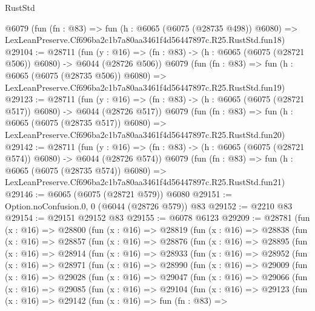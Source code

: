 \begin{lexlean}{RustStd}
\begin{coremodule}
    @6079
    (fun (fn : @83) =>
    fun (h : @6065 (@6075 (@28735 @498)) @6080) =>
    LexLeanPreserve.Cf696ba2c1b7a80aa3461f4d56447897c.R25.RustStd.fun18)
@29104 := @28711
    (fun (y : @16) => (fn : @83) -> (h : @6065 (@6075 (@28721 @506)) @6080) -> @6044 (@28726 @506))
    @6079
    (fun (fn : @83) =>
    fun (h : @6065 (@6075 (@28735 @506)) @6080) =>
    LexLeanPreserve.Cf696ba2c1b7a80aa3461f4d56447897c.R25.RustStd.fun19)
@29123 := @28711
    (fun (y : @16) => (fn : @83) -> (h : @6065 (@6075 (@28721 @517)) @6080) -> @6044 (@28726 @517))
    @6079
    (fun (fn : @83) =>
    fun (h : @6065 (@6075 (@28735 @517)) @6080) =>
    LexLeanPreserve.Cf696ba2c1b7a80aa3461f4d56447897c.R25.RustStd.fun20)
@29142 := @28711
    (fun (y : @16) => (fn : @83) -> (h : @6065 (@6075 (@28721 @574)) @6080) -> @6044 (@28726 @574))
    @6079
    (fun (fn : @83) =>
    fun (h : @6065 (@6075 (@28735 @574)) @6080) =>
    LexLeanPreserve.Cf696ba2c1b7a80aa3461f4d56447897c.R25.RustStd.fun21)
@29146 := @6065 (@6075 (@28721 @579)) @6080
@29151 := Option.noConfusion.{0, 0} (@6044 (@28726 @579)) @83
@29152 := @2210 @83
@29154 := @29151 @29152 @83
@29155 := @6078 @6123
@29209 := @28781
    (fun (x : @16) =>
    @28800
      (fun (x : @16) =>
      @28819
        (fun (x : @16) =>
        @28838
          (fun (x : @16) =>
          @28857
            (fun (x : @16) =>
            @28876
              (fun (x : @16) =>
              @28895
                (fun (x : @16) =>
                @28914
                  (fun (x : @16) =>
                  @28933
                    (fun (x : @16) =>
                    @28952
                      (fun (x : @16) =>
                      @28971
                        (fun (x : @16) =>
                        @28990
                          (fun (x : @16) =>
                          @29009
                            (fun (x : @16) =>
                            @29028
                              (fun (x : @16) =>
                              @29047
                                (fun (x : @16) =>
                                @29066
                                  (fun (x : @16) =>
                                  @29085
                                    (fun (x : @16) =>
                                    @29104
                                      (fun (x : @16) =>
                                      @29123
                                        (fun (x : @16) =>
                                        @29142
                                          (fun (x : @16) =>
                                          fun (fn : @83) =>

\end{coremodule}
\end{lexlean}
